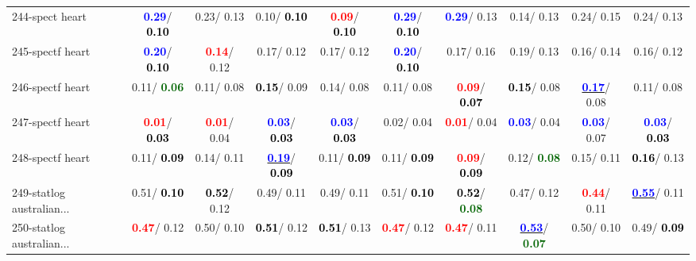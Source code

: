 \begin{table}[h]
\begin{center}
{\begin{tabular}{lc|c|c|c|c|c|c|c|c}
244-spect heart & \textcolor{blue}{\textbf{  0.29}}/\textcolor{black}{\textbf{  0.10}} &   0.23/  0.13 &   0.10/\textcolor{black}{\textbf{  0.10}} & \textcolor{red}{\textbf{  0.09}}/\textcolor{black}{\textbf{  0.10}} & \textcolor{blue}{\textbf{  0.29}}/\textcolor{black}{\textbf{  0.10}} & \textcolor{blue}{\textbf{  0.29}}/  0.13 &   0.14/  0.13 &   0.24/  0.15 &   0.24/  0.13 \\
245-spectf heart & \textcolor{blue}{\textbf{  0.20}}/\textcolor{black}{\textbf{  0.10}} & \textcolor{red}{\textbf{  0.14}}/  0.12 &   0.17/  0.12 &   0.17/  0.12 & \textcolor{blue}{\textbf{  0.20}}/\textcolor{black}{\textbf{  0.10}} &   0.17/  0.16 &   0.19/  0.13 &   0.16/  0.14 &   0.16/  0.12 \\ \hline
246-spectf heart &   0.11/\textcolor{darkgreen}{\textbf{  0.06}} &   0.11/  0.08 & \textcolor{black}{\textbf{  0.15}}/  0.09 &   0.14/  0.08 &   0.11/  0.08 & \textcolor{red}{\textbf{  0.09}}/\textcolor{black}{\textbf{  0.07}} & \textcolor{black}{\textbf{  0.15}}/  0.08 & \underline{\textcolor{blue}{\textbf{  0.17}}}/  0.08 &   0.11/  0.08 \\
247-spectf heart & \textcolor{red}{\textbf{  0.01}}/\textcolor{black}{\textbf{  0.03}} & \textcolor{red}{\textbf{  0.01}}/  0.04 & \textcolor{blue}{\textbf{  0.03}}/\textcolor{black}{\textbf{  0.03}} & \textcolor{blue}{\textbf{  0.03}}/\textcolor{black}{\textbf{  0.03}} &   0.02/  0.04 & \textcolor{red}{\textbf{  0.01}}/  0.04 & \textcolor{blue}{\textbf{  0.03}}/  0.04 & \textcolor{blue}{\textbf{  0.03}}/  0.07 & \textcolor{blue}{\textbf{  0.03}}/\textcolor{black}{\textbf{  0.03}} \\
248-spectf heart &   0.11/\textcolor{black}{\textbf{  0.09}} &   0.14/  0.11 & \underline{\textcolor{blue}{\textbf{  0.19}}}/\textcolor{black}{\textbf{  0.09}} &   0.11/\textcolor{black}{\textbf{  0.09}} &   0.11/\textcolor{black}{\textbf{  0.09}} & \textcolor{red}{\textbf{  0.09}}/\textcolor{black}{\textbf{  0.09}} &   0.12/\textcolor{darkgreen}{\textbf{  0.08}} &   0.15/  0.11 & \textcolor{black}{\textbf{  0.16}}/  0.13 \\
249-statlog australian... &   0.51/\textcolor{black}{\textbf{  0.10}} & \textcolor{black}{\textbf{  0.52}}/  0.12 &   0.49/  0.11 &   0.49/  0.11 &   0.51/\textcolor{black}{\textbf{  0.10}} & \textcolor{black}{\textbf{  0.52}}/\textcolor{darkgreen}{\textbf{  0.08}} &   0.47/  0.12 & \textcolor{red}{\textbf{  0.44}}/  0.11 & \underline{\textcolor{blue}{\textbf{  0.55}}}/  0.11 \\
250-statlog australian... & \textcolor{red}{\textbf{  0.47}}/  0.12 &   0.50/  0.10 & \textcolor{black}{\textbf{  0.51}}/  0.12 & \textcolor{black}{\textbf{  0.51}}/  0.13 & \textcolor{red}{\textbf{  0.47}}/  0.12 & \textcolor{red}{\textbf{  0.47}}/  0.11 & \underline{\textcolor{blue}{\textbf{  0.53}}}/\textcolor{darkgreen}{\textbf{  0.07}} &   0.50/  0.10 &   0.49/\textcolor{black}{\textbf{  0.09}} \\

\end{tabular}}
\end{center}
\end{table}
